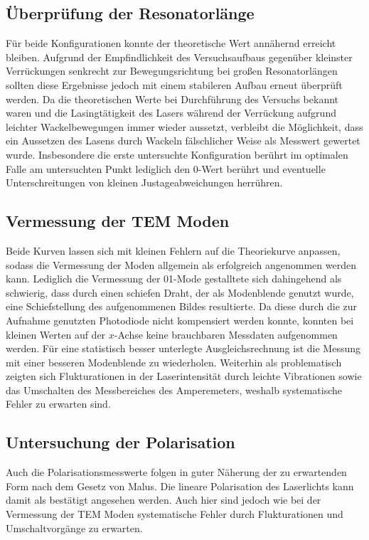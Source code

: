 \subsection{Überprüfung der Resonatorlänge}
Für beide Konfigurationen konnte der theoretische Wert annähernd erreicht bleiben.
Aufgrund der Empfindlichkeit des Versuchsaufbaus gegenüber kleinster Verrückungen
senkrecht zur Bewegungsrichtung bei großen Resonatorlängen sollten diese
Ergebnisse jedoch mit einem stabileren Aufbau erneut überprüft werden.
Da die theoretischen Werte bei Durchführung des Versuchs bekannt waren und die
Lasingtätigkeit des Lasers während der Verrückung aufgrund leichter Wackelbewegungen
immer wieder aussetzt, verbleibt die Möglichkeit, dass ein Aussetzen des Lasens
durch Wackeln fälschlicher Weise als Messwert gewertet wurde.
Insbesondere die erste untersuchte Konfiguration berührt im optimalen Falle
am untersuchten Punkt lediglich den $0$-Wert berührt und eventuelle Unterschreitungen
von kleinen Justageabweichungen herrühren.

\subsection{Vermessung der TEM Moden}
Beide Kurven lassen sich mit kleinen Fehlern auf die Theoriekurve anpassen,
sodass die Vermessung der Moden allgemein als erfolgreich angenommen werden kann.
Lediglich die Vermessung der 01-Mode gestalltete sich dahingehend als schwierig,
dass durch einen schiefen Draht, der als Modenblende genutzt wurde, eine Schiefstellung
des aufgenommenen Bildes resultierte. Da diese durch die zur Aufnahme genutzten
Photodiode nicht kompensiert werden konnte, konnten bei kleinen Werten auf der
$x$-Achse keine brauchbaren Messdaten aufgenommen werden.
Für eine statistisch besser unterlegte Ausgleichsrechnung ist die Messung mit
einer besseren Modenblende zu wiederholen.
Weiterhin als problematisch zeigten sich Flukturationen in der Laserintensität
durch leichte Vibrationen sowie das Umschalten des Messbereiches des Amperemeters,
weshalb systematische Fehler zu erwarten sind.

\subsection{Untersuchung der Polarisation}
Auch die Polarisationsmesswerte folgen in guter Näherung der zu erwartenden Form
nach dem Gesetz von Malus. Die lineare Polarisation des Laserlichts kann damit
als bestätigt angesehen werden. Auch hier sind jedoch wie bei der Vermessung der TEM Moden
systematische Fehler durch Flukturationen und Umschaltvorgänge zu erwarten.

